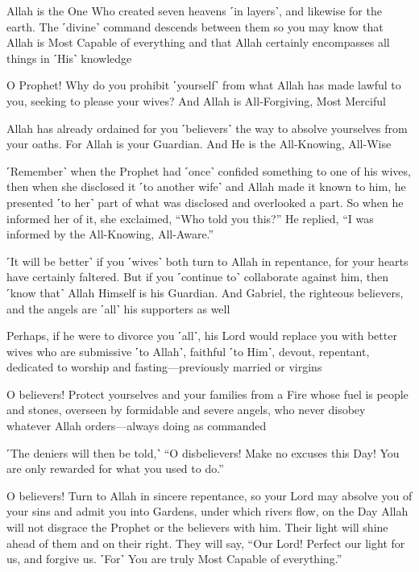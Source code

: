 Allah is the One Who created seven heavens ˹in layers˺, and likewise for the earth. The ˹divine˺ command descends between them so you may know that Allah is Most Capable of everything and that Allah certainly encompasses all things in ˹His˺ knowledge

O Prophet! Why do you prohibit ˹yourself˺ from what Allah has made lawful to you, seeking to please your wives? And Allah is All-Forgiving, Most Merciful

Allah has already ordained for you ˹believers˺ the way to absolve yourselves from your oaths. For Allah is your Guardian. And He is the All-Knowing, All-Wise

˹Remember˺ when the Prophet had ˹once˺ confided something to one of his wives, then when she disclosed it ˹to another wife˺ and Allah made it known to him, he presented ˹to her˺ part of what was disclosed and overlooked a part. So when he informed her of it, she exclaimed, “Who told you this?” He replied, “I was informed by the All-Knowing, All-Aware.”

˹It will be better˺ if you ˹wives˺ both turn to Allah in repentance, for your hearts have certainly faltered. But if you ˹continue to˺ collaborate against him, then ˹know that˺ Allah Himself is his Guardian. And Gabriel, the righteous believers, and the angels are ˹all˺ his supporters as well

Perhaps, if he were to divorce you ˹all˺, his Lord would replace you with better wives who are submissive ˹to Allah˺, faithful ˹to Him˺, devout, repentant, dedicated to worship and fasting—previously married or virgins

O believers! Protect yourselves and your families from a Fire whose fuel is people and stones, overseen by formidable and severe angels, who never disobey whatever Allah orders—always doing as commanded

˹The deniers will then be told,˺ “O disbelievers! Make no excuses this Day! You are only rewarded for what you used to do.”

O believers! Turn to Allah in sincere repentance, so your Lord may absolve you of your sins and admit you into Gardens, under which rivers flow, on the Day Allah will not disgrace the Prophet or the believers with him. Their light will shine ahead of them and on their right. They will say, “Our Lord! Perfect our light for us, and forgive us. ˹For˺ You are truly Most Capable of everything.”

